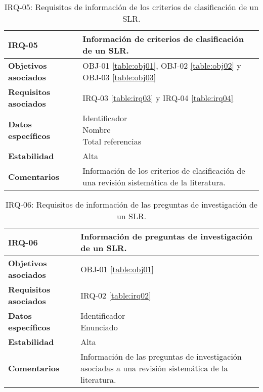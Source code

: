 \begin{table}[!hbt]
	\begin{center}
		\begin{tabular}{|p{5cm}|p{10cm}|}
			\hline
			\textbf{IRQ-05} & Información de criterios de clasificación de un SLR.\\
			\hline
			\textbf{Objetivos asociados} & OBJ-01 \ref{table:obj01}, OBJ-02 \ref{table:obj02} y OBJ-03 \ref{table:obj03}\\
			\hline
			\textbf{Requisitos asociados} & IRQ-03 \ref{table:irq03} y IRQ-04 \ref{table:irq04} \\
			\hline
			\textbf{Datos específicos} & \shortstack[l]{Identificador \\ Nombre \\ Total referencias} \\
			\hline
			\textbf{Estabilidad} & Alta\\
			\hline
			\textbf{Comentarios} & Información de los criterios de clasificación de una revisión sistemática de la literatura.\\
			\hline
		\end{tabular}
		\caption{IRQ-05: Requisitos de información de los criterios de clasificación de un SLR.}
		\label{table:irq05}
	\end{center}
\end{table}

\begin{table}[!hbt]
	\begin{center}
		\begin{tabular}{|p{5cm}|p{10cm}|}
			\hline
			\textbf{IRQ-06} & Información de preguntas de investigación de un SLR.\\
			\hline
			\textbf{Objetivos asociados} & OBJ-01 \ref{table:obj01}\\
			\hline
			\textbf{Requisitos asociados} & IRQ-02 \ref{table:irq02}\\
			\hline
			\textbf{Datos específicos} & \shortstack[l]{Identificador \\ Enunciado} \\
			\hline
			\textbf{Estabilidad} & Alta\\
			\hline
			\textbf{Comentarios} & Información de las preguntas de investigación asociadas a una revisión sistemática de la literatura.\\
			\hline
		\end{tabular}
		\caption{IRQ-06: Requisitos de información de las preguntas de investigación de un SLR.}
		\label{table:irq06}
	\end{center}
\end{table}

